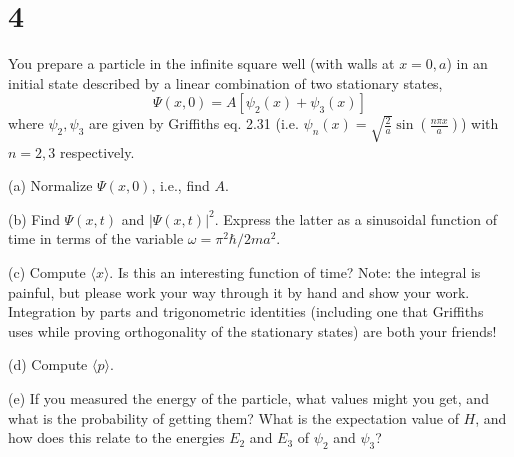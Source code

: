 \documentclass{article}
\begin{document}
\hfil

\section*{4}
\begin{ques}\label{q4}
You prepare a particle in the infinite square well (with walls at $x = 0, a$) in an initial state
described by a linear combination of two stationary states,
\[
\Psi(x, 0) = A[\psi_2(x) + \psi_3(x)]
\]
where $\psi_2, \psi_3$ are given by Griffiths eq. 2.31 (i.e. $\psi_n(x) = \sqrt{\frac{2}{a}}\sin\left(\frac{n\pi x}{a}\right)$) with $n = 2, 3$
respectively.

(a) Normalize $\Psi(x, 0)$, i.e., find $A$.

(b) Find $\Psi(x, t)$ and $|\Psi(x, t)|^2$. Express the latter as a sinusoidal function of time in
terms of the variable $\omega = \pi^2\hbar / 2ma^2$.

(c) Compute $\langle x \rangle$. Is this an interesting function of time? Note: the integral is painful,
but please work your way through it by hand and show your work. Integration by
parts and trigonometric identities (including one that Griffiths uses while proving
orthogonality of the stationary states) are both your friends!

(d) Compute $\langle p \rangle$.

(e) If you measured the energy of the particle, what values might you get, and what is
the probability of getting them? What is the expectation value of $H$, and how does
this relate to the energies $E_2$ and $E_3$ of $\psi_2$ and $\psi_3$?
\end{ques}
\end{document}
